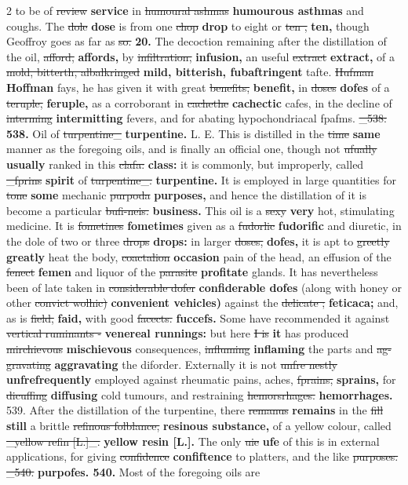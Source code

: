 \documentclass[10pt]{article}
\begin{document}
\begin{multicols}{2}
to be of \sout{review} \textbf{service} in \sout{humoural ashmas} \textbf{humourous asthmas} and coughs. The \sout{dole} \textbf{dose} is from one \sout{chop} \textbf{drop} to eight or \sout{ten ,} \textbf{ten,} though Geoffroy goes as far as \sout{so.} \textbf{20.} The decoction remaining after the distillation of the oil, \sout{afford,} \textbf{affords,} by \sout{infiltration,} \textbf{infusion,} an useful \sout{extract} \textbf{extract,} of a \sout{mold, bitterth, albalkringed} \textbf{mild, bitterish, fubaftringent} tafte. \sout{Hufman} \textbf{Hoffman} fays, he has given it with great \sout{benefits,} \textbf{benefit,} in \sout{doses} \textbf{dofes} of a \sout{teruple,} \textbf{feruple,} as a corroborant in \sout{cachethe} \textbf{cachectic} cafes, in the decline of \sout{interming} \textbf{intermitting} fevers, and for abating hypochondriacal fpafms. \sout{\_538:} \textbf{538.} Oil of \sout{turpentine\_} \textbf{turpentine.} L. E. This is distilled in the \sout{time} \textbf{same} manner as the foregoing oils, and is finally an official one, though not \sout{ufually} \textbf{usually} ranked in this \sout{clafa:} \textbf{class:} it is commonly, but improperly, called \sout{\_fprins} \textbf{spirit} of \sout{turpentine\_.} \textbf{turpentine.} It is employed in large quantities for \sout{tone} \textbf{some} mechanic \sout{purpoda} \textbf{purposes,} and hence the distillation of it is become a particular \sout{bufi-neis.} \textbf{business.} This oil is a \sout{sexy} \textbf{very} hot, stimulating medicine. It is \sout{fometines} \textbf{fometimes} given as a \sout{fudorlic} \textbf{fudorific} and diuretic, in the dole of two or three \sout{drops} \textbf{drops:} in larger \sout{doses,} \textbf{dofes,} it is apt to \sout{greetly} \textbf{greatly} heat the body, \sout{coactalion} \textbf{occasion} pain of the head, an effusion of the \sout{fenect} \textbf{femen} and liquor of the \sout{parasite} \textbf{profitate} glands. It has nevertheless been of late taken in \sout{considerable dofer} \textbf{confiderable dofes} (along with honey or other \sout{convict wolhic)} \textbf{convenient vehicles)} against the \sout{delicate ;} \textbf{feticaca;} and, as is \sout{field,} \textbf{faid,} with good \sout{facects.} \textbf{fuccefs.} Some have recommended it against \sout{vertical ruminants -} \textbf{venereal runnings:} but here \sout{I is} \textbf{it} has produced \sout{mirchievous} \textbf{mischievous} consequences, \sout{influming} \textbf{inflaming} the parts and \sout{ag-gravating} \textbf{aggravating} the diforder. Externally it is not \sout{unfre nestly} \textbf{unfrefrequently} employed against rheumatic pains, aches, \sout{fprains,} \textbf{sprains,} for \sout{dicuffing} \textbf{diffusing} cold tumours, and restraining \sout{hemorsrhages.} \textbf{hemorrhages.} 539. After the distillation of the turpentine, there \sout{remanus} \textbf{remains} in the \sout{fill} \textbf{still} a brittle \sout{refinous folblance,} \textbf{resinous substance,} of a yellow colour, called \sout{\_yellow refin [L.]\_.} \textbf{yellow resin [L.].} The only \sout{uie} \textbf{ufe} of this is in external applications, for giving \sout{confidence} \textbf{confiftence} to platters, and the like \sout{purposes. \_540.} \textbf{purpofes. 540.} Most of the foregoing oils are 
\end{multicols}
\end{document}
